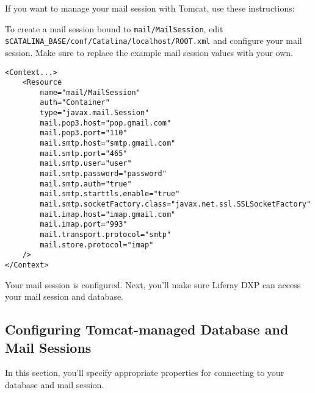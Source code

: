 If you want to manage your mail session with Tomcat, use these
instructions:

To create a mail session bound to \texttt{mail/MailSession}, edit
\texttt{\$CATALINA\_BASE/conf/Catalina/localhost/ROOT.xml} and configure
your mail session. Make sure to replace the example mail session values
with your own.

\begin{verbatim}
<Context...>
    <Resource
        name="mail/MailSession"
        auth="Container"
        type="javax.mail.Session"
        mail.pop3.host="pop.gmail.com"
        mail.pop3.port="110"
        mail.smtp.host="smtp.gmail.com"
        mail.smtp.port="465"
        mail.smtp.user="user"
        mail.smtp.password="password"
        mail.smtp.auth="true"
        mail.smtp.starttls.enable="true"
        mail.smtp.socketFactory.class="javax.net.ssl.SSLSocketFactory"
        mail.imap.host="imap.gmail.com"
        mail.imap.port="993"
        mail.transport.protocol="smtp"
        mail.store.protocol="imap"
    />
</Context>
\end{verbatim}

Your mail session is configured. Next, you'll make sure Liferay DXP can
access your mail session and database.

\subsection{Configuring Tomcat-managed Database and Mail
Sessions}\label{configuring-tomcat-managed-database-and-mail-sessions}

In this section, you'll specify appropriate properties for connecting to
your database and mail session.

